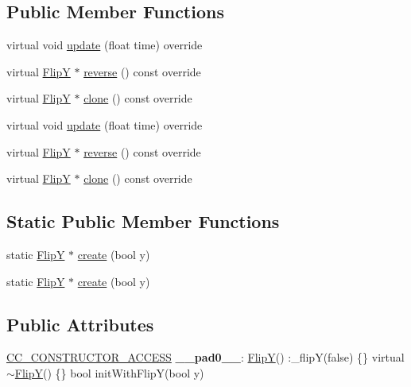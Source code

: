 \subsection*{Public Member Functions}
\begin{DoxyCompactItemize}
\item 
virtual void \hyperlink{classFlipY_a75442be63f171b641a1f98165e915439}{update} (float time) override
\item 
virtual \hyperlink{classFlipY}{FlipY} $\ast$ \hyperlink{classFlipY_a41c7c49f5a9cac8f174ce8eb79eb4d0d}{reverse} () const override
\item 
virtual \hyperlink{classFlipY}{FlipY} $\ast$ \hyperlink{classFlipY_a03fd09bf5754b23d7396d46bb4f594b2}{clone} () const override
\item 
virtual void \hyperlink{classFlipY_a51936fab0a0dc692e381a8a89c3d8e43}{update} (float time) override
\item 
virtual \hyperlink{classFlipY}{FlipY} $\ast$ \hyperlink{classFlipY_a1b49c042ac0ac7036ed1447f725e091d}{reverse} () const override
\item 
virtual \hyperlink{classFlipY}{FlipY} $\ast$ \hyperlink{classFlipY_afdd6cd24fb2238c5a13acc373c7ed6f7}{clone} () const override
\end{DoxyCompactItemize}
\subsection*{Static Public Member Functions}
\begin{DoxyCompactItemize}
\item 
static \hyperlink{classFlipY}{FlipY} $\ast$ \hyperlink{classFlipY_a663bf94167b8e4a0ffc9466f8995d889}{create} (bool y)
\item 
static \hyperlink{classFlipY}{FlipY} $\ast$ \hyperlink{classFlipY_ae509cb6ad532fe6a1839bb4d696f3a2f}{create} (bool y)
\end{DoxyCompactItemize}
\subsection*{Public Attributes}
\begin{DoxyCompactItemize}
\item 
\mbox{\label{classFlipY_a5fce307d41878a23ba8dead67c9709b3}} 
\hyperlink{_2cocos2d_2cocos_2base_2ccConfig_8h_a25ef1314f97c35a2ed3d029b0ead6da0}{C\+C\+\_\+\+C\+O\+N\+S\+T\+R\+U\+C\+T\+O\+R\+\_\+\+A\+C\+C\+E\+SS} {\bfseries \+\_\+\+\_\+pad0\+\_\+\+\_\+}\+: \hyperlink{classFlipY}{FlipY}() \+:\+\_\+flipY(false) \{\} virtual $\sim$\hyperlink{classFlipY}{FlipY}() \{\} bool init\+With\+FlipY(bool y)
\end{DoxyCompactItemize}

